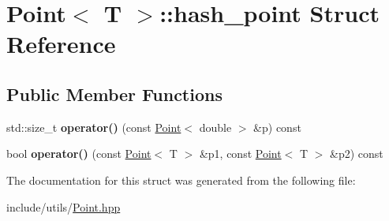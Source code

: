 \hypertarget{structPoint_1_1hash__point}{}\section{Point$<$ T $>$\+:\+:hash\+\_\+point Struct Reference}
\label{structPoint_1_1hash__point}
\subsection*{Public Member Functions}
\begin{DoxyCompactItemize}
\item 
\mbox{\label{structPoint_1_1hash__point_a7d05b1d732eaee94eb6f1b75dccf8bea}} 
std\+::size\+\_\+t {\bfseries operator()} (const \hyperlink{classPoint}{Point}$<$ double $>$ \&p) const
\item 
\mbox{\label{structPoint_1_1hash__point_a17bb0549df4147455615803d80be6745}} 
bool {\bfseries operator()} (const \hyperlink{classPoint}{Point}$<$ T $>$ \&p1, const \hyperlink{classPoint}{Point}$<$ T $>$ \&p2) const
\end{DoxyCompactItemize}


The documentation for this struct was generated from the following file\+:\begin{DoxyCompactItemize}
\item 
include/utils/\hyperlink{Point_8hpp}{Point.\+hpp}\end{DoxyCompactItemize}
